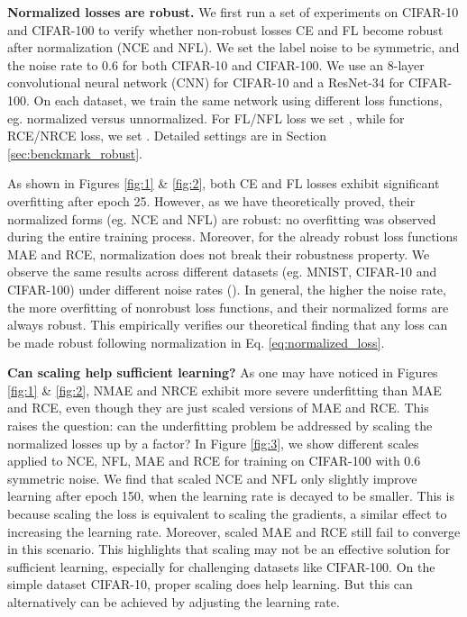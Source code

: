 \documentclass{article}
\begin{document}
\noindent\textbf{Normalized losses are robust.}
We first run a set of experiments on CIFAR-10 and CIFAR-100 to verify whether non-robust losses CE and FL become robust after normalization (NCE and NFL). We set the label noise to be symmetric, and the noise rate to 0.6 for both CIFAR-10 and CIFAR-100. We use an 8-layer convolutional neural network (CNN) for CIFAR-10 and a ResNet-34 \cite{he2016deep} for CIFAR-100. On each dataset, we train the same network using different loss functions, eg. normalized versus unnormalized. For FL/NFL loss we set , while for RCE/NRCE loss, we set . 
Detailed settings are in Section \ref{sec:benckmark_robust}.

As shown in Figures \ref{fig:1} \& \ref{fig:2}, both CE and FL losses exhibit significant overfitting after epoch 25. However, as we have theoretically proved, their normalized forms (eg. NCE and NFL) are robust: no overfitting was observed during the entire training process. Moreover, for the already robust loss functions MAE and RCE, normalization does not break their robustness property. We observe the same results across different datasets (eg. MNIST, CIFAR-10 and CIFAR-100) under different noise rates (). In general, the higher the noise rate, the more overfitting of nonrobust loss functions, and their normalized forms are always robust. This empirically verifies our theoretical finding that any loss can be made robust following normalization in Eq. \eqref{eq:normalized_loss}.

\noindent\textbf{Can scaling help sufficient learning?}
As one may have noticed in Figures \ref{fig:1} \& \ref{fig:2}, NMAE and NRCE exhibit more severe underfitting than MAE and RCE, even though they are just scaled versions of MAE and RCE. This raises the question: can the underfitting problem be addressed by scaling the normalized losses up by a factor?
In Figure \ref{fig:3}, we show different scales applied to NCE, NFL, MAE and RCE for training on CIFAR-100 with 0.6 symmetric noise. We find that scaled NCE and NFL only slightly improve learning after epoch 150, when the learning rate is decayed to be smaller. This is because scaling the loss is equivalent to scaling the gradients, a similar effect to increasing the learning rate. Moreover, scaled MAE and RCE still fail to converge in this scenario.
This highlights that scaling may not be an effective solution for sufficient learning, especially for challenging datasets like CIFAR-100. On the simple dataset CIFAR-10, proper scaling does help learning. But this can alternatively can be achieved by adjusting the learning rate.
\end{document}
